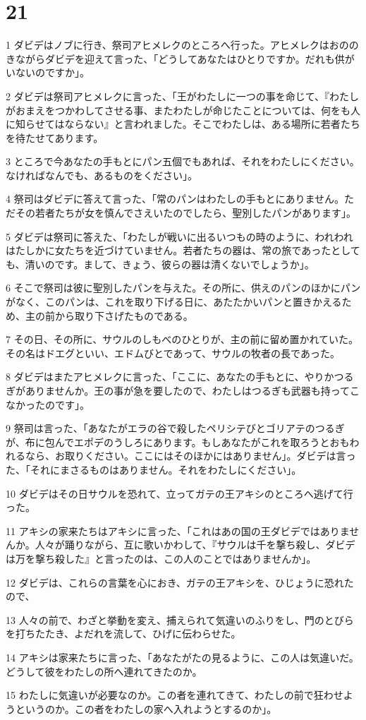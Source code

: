 \chapter{21}

\par 1 ダビデはノブに行き、祭司アヒメレクのところへ行った。アヒメレクはおののきながらダビデを迎えて言った、「どうしてあなたはひとりですか。だれも供がいないのですか」。
\par 2 ダビデは祭司アヒメレクに言った、「王がわたしに一つの事を命じて、『わたしがおまえをつかわしてさせる事、またわたしが命じたことについては、何をも人に知らせてはならない』と言われました。そこでわたしは、ある場所に若者たちを待たせてあります。
\par 3 ところで今あなたの手もとにパン五個でもあれば、それをわたしにください。なければなんでも、あるものをください」。
\par 4 祭司はダビデに答えて言った、「常のパンはわたしの手もとにありません。ただその若者たちが女を慎んでさえいたのでしたら、聖別したパンがあります」。
\par 5 ダビデは祭司に答えた、「わたしが戦いに出るいつもの時のように、われわれはたしかに女たちを近づけていません。若者たちの器は、常の旅であったとしても、清いのです。まして、きょう、彼らの器は清くないでしょうか」。
\par 6 そこで祭司は彼に聖別したパンを与えた。その所に、供えのパンのほかにパンがなく、このパンは、これを取り下げる日に、あたたかいパンと置きかえるため、主の前から取り下さげたものである。
\par 7 その日、その所に、サウルのしもべのひとりが、主の前に留め置かれていた。その名はドエグといい、エドムびとであって、サウルの牧者の長であった。
\par 8 ダビデはまたアヒメレクに言った、「ここに、あなたの手もとに、やりかつるぎがありませんか。王の事が急を要したので、わたしはつるぎも武器も持ってこなかったのです」。
\par 9 祭司は言った、「あなたがエラの谷で殺したペリシテびとゴリアテのつるぎが、布に包んでエポデのうしろにあります。もしあなたがこれを取ろうとおもわれるなら、お取りください。ここにはそのほかにはありません」。ダビデは言った、「それにまさるものはありません。それをわたしにください」。
\par 10 ダビデはその日サウルを恐れて、立ってガテの王アキシのところへ逃げて行った。
\par 11 アキシの家来たちはアキシに言った、「これはあの国の王ダビデではありませんか。人々が踊りながら、互に歌いかわして、『サウルは千を撃ち殺し、ダビデは万を撃ち殺した』と言ったのは、この人のことではありませんか」。
\par 12 ダビデは、これらの言葉を心におき、ガテの王アキシを、ひじょうに恐れたので、
\par 13 人々の前で、わざと挙動を変え、捕えられて気違いのふりをし、門のとびらを打ちたたき、よだれを流して、ひげに伝わらせた。
\par 14 アキシは家来たちに言った、「あなたがたの見るように、この人は気違いだ。どうして彼をわたしの所へ連れてきたのか。
\par 15 わたしに気違いが必要なのか。この者を連れてきて、わたしの前で狂わせようというのか。この者をわたしの家へ入れようとするのか」。

